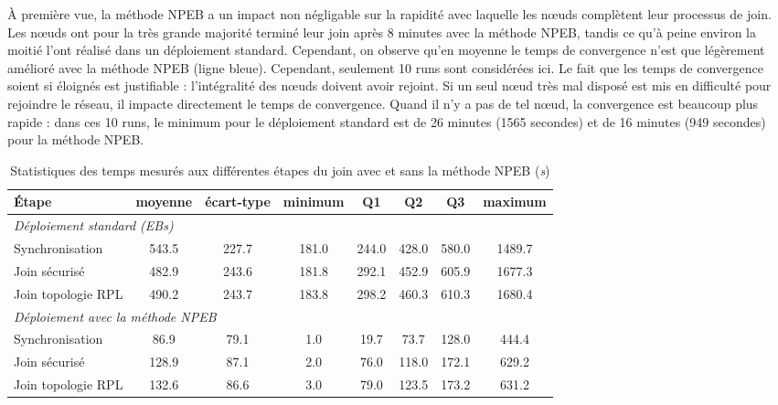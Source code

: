 \documentclass[]{report}
\begin{document}
À première vue, la méthode NPEB a un impact non négligable sur la rapidité avec laquelle les nœuds complètent leur processus de join. Les nœuds ont pour la très grande majorité terminé leur join après 8 minutes avec la méthode NPEB, tandis ce qu'à peine environ la moitié l'ont réalisé dans un déploiement standard. Cependant, on observe qu'en moyenne le temps de convergence n'est que légèrement amélioré avec la méthode NPEB (ligne bleue). Cependant, seulement 10 runs sont considérées ici. Le fait que les temps de convergence soient si éloignés est justifiable : l'intégralité des nœuds doivent avoir rejoint. Si un seul nœud très mal disposé est mis en difficulté pour rejoindre le réseau, il impacte directement le temps de convergence. Quand il n'y a pas de tel nœud, la convergence est beaucoup plus rapide : dans ces 10 runs, le minimum pour le déploiement standard est de 26 minutes (1565 secondes) et de 16 minutes (949 secondes) pour la méthode NPEB.

\newpage

\begin{table}[h]
\centering
\begin{tabular}{|l|c|c|c|c|c|c|c|}
	\hline
    \textbf{\textbf{Étape}} & moyenne & écart-type & minimum & Q1 & Q2 & Q3 & maximum\\
    \hline
    \multicolumn{8}{|l|}{\textit{Déploiement standard (EBs)}}\\  
    \hline
    Synchronisation & 543.5 & 227.7 & 181.0 & 244.0 & 428.0 & 580.0 & 1489.7 \\
    \hline
    Join sécurisé & 482.9 & 243.6 & 181.8 & 292.1 & 452.9 & 605.9 & 1677.3 \\
    \hline
    Join topologie RPL & 490.2 & 243.7 & 183.8 & 298.2 & 460.3 & 610.3 & 1680.4 \\
    \hline
    \multicolumn{8}{|l|}{\textit{Déploiement avec la méthode NPEB}}\\    
    \hline
    Synchronisation & 86.9 & 79.1 & 1.0 & 19.7 & 73.7 & 128.0 & 444.4 \\
    \hline
    Join sécurisé & 128.9 & 87.1 & 2.0 & 76.0 & 118.0 & 172.1 & 629.2 \\
    \hline
    Join topologie RPL & 132.6 & 86.6 & 3.0 & 79.0 & 123.5 & 173.2 & 631.2 \\
    \hline
\end{tabular}
\caption{Statistiques des temps mesurés aux différentes étapes du join avec et sans la méthode NPEB (\textit{s})}
\label{table_times}
\end{table}
\end{document}
